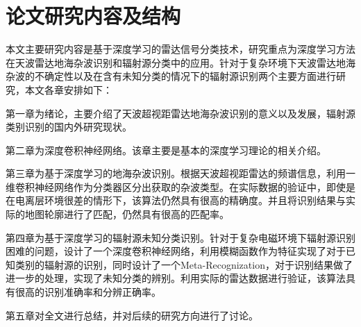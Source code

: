 \section{论文研究内容及结构}

本文主要研究内容是基于深度学习的雷达信号分类技术，研究重点为深度学习方法在天波雷达地海杂波识别和辐射源分类中的应用。针对于复杂环境下天波雷达地海杂波的不确定性以及在含有未知分类的情况下的辐射源识别两个主要方面进行研究，本文各章安排如下：

第一章为绪论，主要介绍了天波超视距雷达地海杂波识别的意义以及发展，辐射源类别识别的国内外研究现状。

第二章为深度卷积神经网络。该章主要是基本的深度学习理论的相关介绍。

第三章为基于深度学习的地海杂波识别。根据天波超视距雷达的频谱信息，利用一维卷积神经网络作为分类器区分出获取的杂波类型。在实际数据的验证中，即使是在电离层环境很差的情形下，该算法仍然具有很高的精确度。并且将识别结果与实际的地图轮廓进行了匹配，仍然具有很高的匹配率。

第四章为基于深度学习的辐射源未知分类识别。针对于复杂电磁环境下辐射源识别困难的问题，设计了一个深度卷积神经网络，利用模糊函数作为特征实现了对于已知类别的辐射源的识别，同时设计了一个Meta-Recognization，对于识别结果做了进一步的处理，实现了未知分类的辨别。利用实际的雷达数据进行验证，该算法具有很高的识别准确率和分辨正确率。

第五章对全文进行总结，并对后续的研究方向进行了讨论。